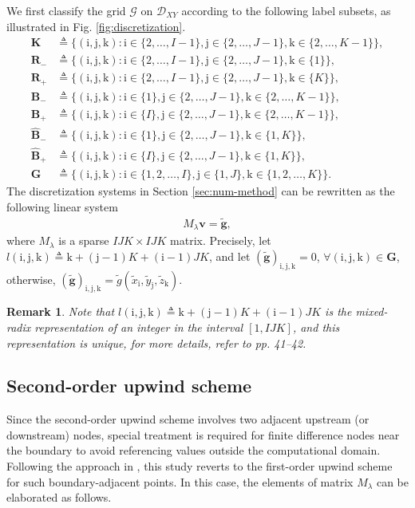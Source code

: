 \documentclass[12pt]{article}
\numberwithin{equation}{section}
\newtheorem{remark}[theorem]{Remark}
\newcommand{\cG}{\mathcal{G}}
\newcommand{\ri}{\mathrm{i}}
\newcommand{\rj}{\mathrm{j}}
\newcommand{\rk}{\mathrm{k}}
\begin{document}
We first classify the grid $\cG $ on $\mathcal{D}_{XY}$ according to 
the following label subsets, as illustrated in Fig. \ref{fig:discretization}. 
\begin{align*}
	\bm{K} &\triangleq \Big\{(\ri,\rj,\rk): \ri\in\{2,\ldots, I-1\}, \rj\in \{2,\ldots, J-1\}, \rk\in\{2,\ldots, K-1\} \Big\}, \\
	\bm{R}_{-} & \triangleq  \Big\{(\ri,\rj,\rk): \ri\in\{2,\ldots, I-1\}, \rj\in \{2,\ldots, J-1\}, \rk\in\{1\}\Big\},\\
	\bm{R}_{+} & \triangleq \Big\{(\ri,\rj,\rk): \ri\in\{2,\ldots, I-1\}, \rj\in \{2,\ldots, J-1\}, \rk\in\{K\}\Big\},\\
	\bm{B}_{-} & \triangleq  \Big\{(\ri,\rj,\rk): \ri\in\{1\}, \rj\in \{2,\ldots, J-1\}, \rk\in\{2,\ldots, K-1\}\Big\},\\
	\bm{B}_{+} & \triangleq  \Big\{(\ri,\rj,\rk): \ri\in\{I\}, \rj\in \{2,\ldots, J-1\}, \rk\in\{2,\ldots, K-1\}\Big\}, \\
	\hat{\bm{B}}_{-} & \triangleq  \Big\{(\ri,\rj,\rk): \ri\in\{1\}, \rj\in \{2,\ldots, J-1\}, \rk\in\{1, K\}\Big\},\\
	\hat{\bm{B}}_{+} & \triangleq  \Big\{(\ri,\rj,\rk): \ri\in\{I\}, \rj\in \{2,\ldots, J-1\}, \rk\in\{1, K\}\Big\},\\
	\bm{G} &\triangleq \Big\{(\ri,\rj,\rk): \ri\in\{1,2,\ldots,I\}, \rj\in \{1,J\}, \rk\in\{1,2,\ldots, K\}\Big\}. 
\end{align*}
The discretization systems in Section \ref{sec:num-method} can be rewritten as the 
following linear system 
\begin{align*}
	M_{\lambda}\bm{v} = \tilde{\bm{g}}, 
\end{align*}
where $M_{\lambda}$ is a sparse $IJK \times IJK$ matrix. 
Precisely, let $l(\ri,\rj,\rk) \triangleq \rk + (\rj -1)K + (\ri-1)JK$, 
and let $(\tilde{\bm{g}})_{\ri,\rj,\rk} = 0$, $\forall (\ri,\rj,\rk) \in \bm{G}$, 
otherwise, $(\tilde{\bm{g}})_{\ri,\rj,\rk} = \tilde{g}(\tilde{x}_{\ri}, \tilde{y}_{\rj}, \tilde{z}_{\rk})$. 
\begin{remark}
	Note that $l(\ri,\rj,\rk) \triangleq \rk + (\rj -1)K + (\ri-1)JK$ is the 
	mixed-radix representation of an integer in the interval $[1, IJK]$, 
	and this representation is unique, for more details, refer to \cite{ST67} pp. 41--42. 
\end{remark} 


\subsection{Second-order upwind scheme}
Since the second-order upwind scheme involves two adjacent upstream (or downstream) nodes, 
special treatment is required for finite difference nodes near the boundary to 
avoid referencing values outside the computational domain. 
Following the approach in \cite{vanka1987second}, 
this study reverts to the first-order upwind scheme for such boundary-adjacent points.
In this case,  
the elements of matrix $M_{\lambda}$ can be elaborated as follows. 
\end{document}
